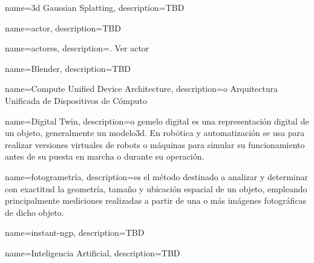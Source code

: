 


{
    name={\acrshort{3d} Gaussian Splatting},
    description={TBD}
}


{
    name={actor},
    description={TBD}
}

{
    name={actores},
    description={. Ver \gls{actor}}
}


{
    name={Blender},
    description={TBD}
}


{
    name={Compute Unified Device Architecture},
    description={o Arquitectura Unificada de Dispositivos de Cómputo}
}


{
    name={Digital Twin},
    description={o gemelo digital es una representación digital de un objeto, generalmente un \gls{modelo3d}. En robótica y automatización se usa para realizar versiones virtuales de robots o máquinas para simular su funcionamiento antes de su puesta en marcha o durante su operación.}
}



{
    name={fotogrametría},
    description={es el método destinado a analizar y determinar con exactitud la geometría, tamaño y ubicación espacial de un objeto, empleando principalmente mediciones realizadas a partir de una o más imágenes fotográficas de dicho objeto.}
}




{
    name={instant-ngp},
    description={TBD}
}

{
    name={Inteligencia Artificial},
    description={TBD}
}

